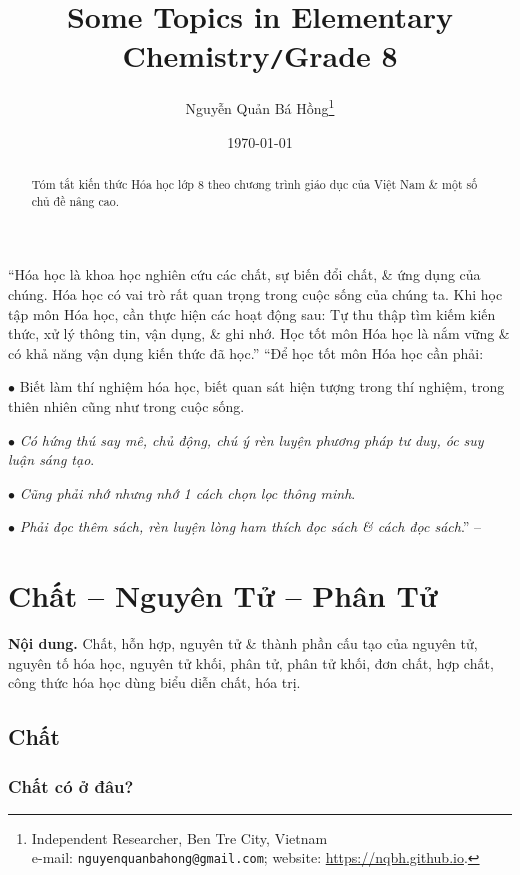 \documentclass{article}
\title{Some Topics in Elementary Chemistry\texttt{/}Grade 8}
\author{Nguyễn Quản Bá Hồng\footnote{Independent Researcher, Ben Tre City, Vietnam\\e-mail: \texttt{nguyenquanbahong@gmail.com}; website: \url{https://nqbh.github.io}.}}
\date{\today}
\numberwithin{equation}{section}
\begin{document}
\maketitle
\begin{abstract}
	Tóm tắt kiến thức Hóa học lớp 8 theo chương trình giáo dục của Việt Nam \& một số chủ đề nâng cao.
\end{abstract}
\setcounter{secnumdepth}{4}
\setcounter{tocdepth}{3}
\tableofcontents
\newpage


``Hóa học là khoa học nghiên cứu các chất, sự biến đổi chất, \& ứng dụng của chúng. Hóa học có vai trò rất quan trọng trong cuộc sống của chúng ta. Khi học tập môn Hóa học, cần thực hiện các hoạt động sau: Tự thu thập tìm kiếm kiến thức, xử lý thông tin, vận dụng, \& ghi nhớ. Học tốt môn Hóa học là nắm vững \& có khả năng vận dụng kiến thức đã học.'' ``Để học tốt môn Hóa học cần phải:
\begin{enumerate*}
	\item[$\bullet$] Biết làm thí nghiệm hóa học, biết quan sát hiện tượng trong thí nghiệm, trong thiên nhiên cũng như trong cuộc sống.
	\item[$\bullet$] \textit{Có hứng thú say mê, chủ động, chú ý rèn luyện phương pháp tư duy, óc suy luận sáng tạo}.
	\item[$\bullet$] \textit{Cũng phải nhớ nhưng nhớ 1 cách chọn lọc thông minh}.
	\item[$\bullet$] \textit{Phải đọc thêm sách, rèn luyện lòng ham thích đọc sách \& cách đọc sách}.'' -- \cite[p. 5]{SGK_Hoa_Hoc_8}
\end{enumerate*}

\section{Chất -- Nguyên Tử -- Phân Tử}
\textsf{\textbf{Nội dung.} Chất, hỗn hợp, nguyên tử \& thành phần cấu tạo của nguyên tử, nguyên tố hóa học, nguyên tử khối, phân tử, phân tử khối, đơn chất, hợp chất, công thức hóa học dùng biểu diễn chất, hóa trị.}

\subsection{Chất}

\subsubsection{Chất có ở đâu?}
\end{document}
